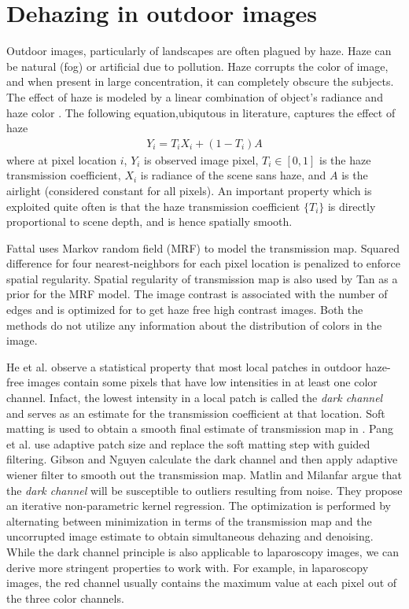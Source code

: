 \section{Dehazing in outdoor images}
Outdoor images, particularly of landscapes are often plagued by haze. Haze can be natural (fog) or artificial due to pollution. Haze corrupts the color of image, and when present in large concentration, it can completely obscure the subjects. The effect of haze is modeled by a linear combination of object's radiance and haze color \cite{koschmieder1925smokemodel}. The following equation,ubiqutous in literature, captures the effect of haze
\begin{align}
    Y_i = T_i X_i + \left( 1 - T_i \right) A \label{eqn:hazemodel}
\end{align}
where at pixel location $i$, $Y_i$ is observed image pixel, $T_i \in [0, 1]$ is the haze transmission coefficient, $X_i$ is radiance of the scene sans haze, and $A$ is the airlight (considered constant for all pixels). An important property which is exploited quite often is that the haze transmission coefficient $\lbrace T_i \rbrace$ is directly proportional to scene depth, and is hence spatially smooth.

Fattal \cite{fattal2008single} uses Markov random field (MRF) to model the transmission map. Squared difference for four nearest-neighbors for each pixel location is penalized to enforce spatial regularity. Spatial regularity of transmission map is also used by Tan \cite{tan2008visibility} as a prior for the MRF model. The image contrast is associated with the number of edges and is optimized for to get haze free high contrast images. Both the methods do not utilize any information about the distribution of colors in the image.

He et al. \cite{he2011dark} observe a statistical property that most local patches in outdoor haze-free images contain some pixels that have low intensities in at least one color channel. Infact, the lowest intensity in a local patch is called the \emph{dark channel} and serves as an estimate for the transmission coefficient at that location. Soft matting is used to obtain a smooth final estimate of transmission map in \cite{he2011dark}. Pang et al. \cite{pang2011improved} use adaptive patch size and replace the soft matting step with guided filtering. Gibson and Nguyen \cite{gibson2013wiener} calculate the dark channel and then apply adaptive wiener filter to smooth out the transmission map. Matlin and Milanfar \cite{matlin2012removal} argue that the \emph{dark channel} will be susceptible to outliers resulting from noise. They propose an iterative non-parametric kernel regression. The optimization is performed by alternating between minimization in terms of the transmission map and the uncorrupted image estimate to obtain simultaneous dehazing and denoising. While the dark channel principle is also applicable to laparoscopy images, we can derive more stringent properties to work with. For example, in laparoscopy images, the red channel usually contains the maximum value at each pixel out of the three color channels. 

